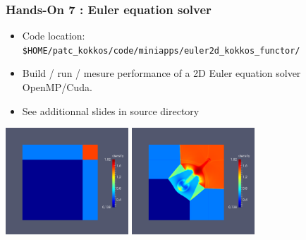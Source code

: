\begin{frame}[fragile=singleslide]
  \frametitle{Hands-On 7 : Euler equation solver}

  \begin{itemize}
  \item Code location: \texttt{\$HOME/patc\_kokkos/code/miniapps/euler2d\_kokkos\_functor/}
  \item Build / run / mesure performance of a 2D Euler equation solver OpenMP/Cuda.
  \item See additionnal slides in source directory
  \end{itemize}
  
  \begin{center}
    \includegraphics[height=4cm]{../euler/images/riemann/riemann_1}
    \hspace{0.1cm}
    \includegraphics[height=4cm]{../euler/images/riemann/riemann_2}
  \end{center}


\end{frame}
